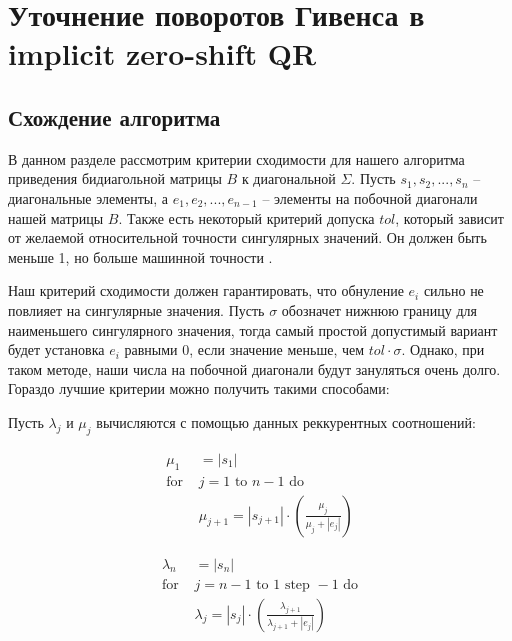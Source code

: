 \documentclass[12pt, a4paper]{report}
\theoremstyle{note}
\begin{document}
\tableofcontents

\chapter{Уточнение поворотов Гивенса в implicit zero-shift QR}

\section{Схождение алгоритма}
В данном разделе рассмотрим критерии сходимости для нашего алгоритма приведения бидиагольной матрицы $B$ к диагональной $\Sigma$. Пусть $s_1, s_2,...,s_n$ \--- диагональные элементы, а $e_1, e_2, ..., e_{n-1}$ \--- элементы на побочной диагонали нашей матрицы $B$. Также есть некоторый критерий допуска $tol$, который зависит от желаемой относительной точности сингулярных значений. Он должен быть меньше 1, но больше машинной точности \epsilon.

Наш критерий сходимости должен гарантировать, что обнуление $e_i$ сильно не повлияет на сингулярные значения. Пусть $\sigma$ обозначет нижнюю границу для наименьшего сингулярного значения, тогда самый простой допустимый вариант будет установка $e_i$ равными 0, если значение меньше, чем $tol\cdot\sigma$. Однако, при таком методе, наши числа на побочной диагонали будут зануляться очень долго. Гораздо лучшие критерии можно получить такими способами:

Пусть $\lambda_j$ и $\mu_j$ вычисляются с помощью данных реккурентных соотношений:

\begin{minipage}{0.48\textwidth}
\begin{align*}
\mu_1& = |s_1| \\
\text{for }& j = 1 \text{ to } n-1 \text{ do} \\
&\mu_{j+1} = |s_{j+1}| \cdot \left( \frac{\mu_j}{\mu_j + |e_j|} \right)
\end{align*}
\end{minipage}
\hfill
\begin{minipage}{0.48\textwidth}
\begin{align*}
\lambda_n& = |s_n| \\
\text{for }& j = n-1 \text{ to } 1 \text{ step } -1 \text{ do} \\
&\lambda_j = |s_j| \cdot \left( \frac{\lambda_{j+1}}{\lambda_{j+1} + |e_j|} \right)
\end{align*}
\end{minipage}
\vspace{1em}
\end{document}
